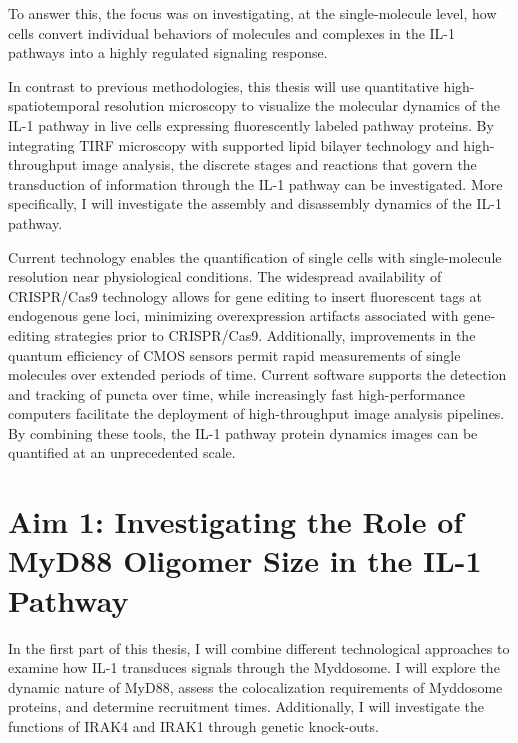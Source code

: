 To answer this, the focus was on investigating, at the single-molecule level, how cells convert individual behaviors of molecules and complexes in the IL-1 pathways into a highly regulated signaling response.
 
In contrast to previous methodologies, this thesis will use quantitative high-spatiotemporal resolution microscopy to visualize the molecular dynamics of the IL-1 pathway in live cells expressing fluorescently labeled pathway proteins. By integrating TIRF microscopy with supported lipid bilayer technology and high-throughput image analysis, the discrete stages and reactions that govern the transduction of information through the IL-1 pathway can be investigated. More specifically, I will investigate the assembly and disassembly dynamics of the IL-1 pathway.
 
Current technology enables the quantification of single cells with single-molecule resolution near physiological conditions. The widespread availability of CRISPR/Cas9 technology allows for gene editing to insert fluorescent tags at endogenous gene loci, minimizing overexpression artifacts associated with gene-editing strategies prior to CRISPR/Cas9. Additionally, improvements in the quantum efficiency of CMOS sensors permit rapid measurements of single molecules over extended periods of time. Current software supports the detection and tracking of puncta over time, while increasingly fast high-performance computers facilitate the deployment of high-throughput image analysis pipelines. By combining these tools, the IL-1 pathway protein dynamics images can be quantified at an unprecedented scale.

\section{Aim 1: Investigating the Role of MyD88 Oligomer Size in the IL-1 Pathway}
In the first part of this thesis, I will combine different technological approaches to examine how IL-1 transduces signals through the Myddosome. I will explore the dynamic nature of MyD88, assess the colocalization requirements of Myddosome proteins, and determine recruitment times. Additionally, I will investigate the functions of IRAK4 and IRAK1 through genetic knock-outs.

